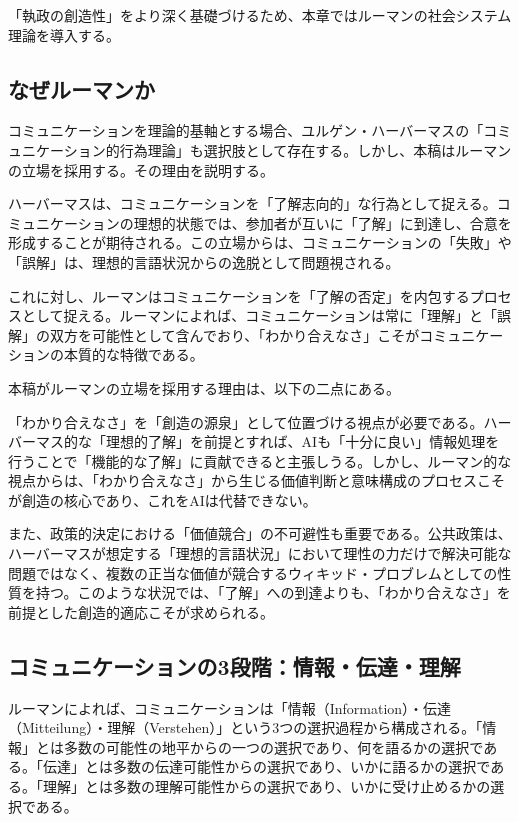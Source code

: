 \documentclass{keikaku}
\begin{document}
「執政の創造性」をより深く基礎づけるため、本章ではルーマンの社会システム理論を導入する。

\subsection{なぜルーマンか}

コミュニケーションを理論的基軸とする場合、ユルゲン・ハーバーマスの「コミュニケーション的行為理論」も選択肢として存在する\cite{habermas1981}。しかし、本稿はルーマンの立場を採用する。その理由を説明する。

ハーバーマスは、コミュニケーションを「了解志向的」な行為として捉える。コミュニケーションの理想的状態では、参加者が互いに「了解」に到達し、合意を形成することが期待される。この立場からは、コミュニケーションの「失敗」や「誤解」は、理想的言語状況からの逸脱として問題視される。

これに対し、ルーマンはコミュニケーションを「了解の否定」を内包するプロセスとして捉える。ルーマンによれば、コミュニケーションは常に「理解」と「誤解」の双方を可能性として含んでおり、「わかり合えなさ」こそがコミュニケーションの本質的な特徴である\cite{luhmann1984}。

本稿がルーマンの立場を採用する理由は、以下の二点にある。

「わかり合えなさ」を「創造の源泉」として位置づける視点が必要である。ハーバーマス的な「理想的了解」を前提とすれば、AIも「十分に良い」情報処理を行うことで「機能的な了解」に貢献できると主張しうる。しかし、ルーマン的な視点からは、「わかり合えなさ」から生じる価値判断と意味構成のプロセスこそが創造の核心であり、これをAIは代替できない。

また、政策的決定における「価値競合」の不可避性も重要である。公共政策は、ハーバーマスが想定する「理想的言語状況」において理性の力だけで解決可能な問題ではなく、複数の正当な価値が競合するウィキッド・プロブレムとしての性質を持つ。このような状況では、「了解」への到達よりも、「わかり合えなさ」を前提とした創造的適応こそが求められる。

\subsection{コミュニケーションの3段階：情報・伝達・理解}

ルーマンによれば、コミュニケーションは「情報（Information）・伝達（Mitteilung）・理解（Verstehen）」という3つの選択過程から構成される\cite{luhmann1984}。「情報」とは多数の可能性の地平からの一つの選択であり、何を語るかの選択である。「伝達」とは多数の伝達可能性からの選択であり、いかに語るかの選択である。「理解」とは多数の理解可能性からの選択であり、いかに受け止めるかの選択である。
\end{document}
